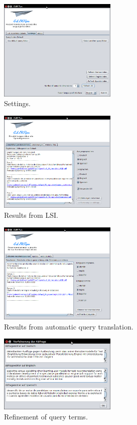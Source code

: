 \documentclass{llncs}
\begin{document}
\begin{figure}[h!]
  \centering
      \includegraphics[width=0.5\textwidth]{Settings.png}
  \caption{Settings.}
\end{figure}

\begin{figure}[h!]
  \centering
      \includegraphics[width=0.5\textwidth]{ResultsLSI.png}
  \caption{Results from LSI.}
\end{figure}

\begin{figure}[h!]
  \centering
      \includegraphics[width=0.5\textwidth]{Results.png}
  \caption{Results from automatic query translation.}
\end{figure}

\begin{figure}[h!]
  \centering
      \includegraphics[width=0.5\textwidth]{Refinement.png}
  \caption{Refinement of query terms.}
\end{figure}
\end{document}
